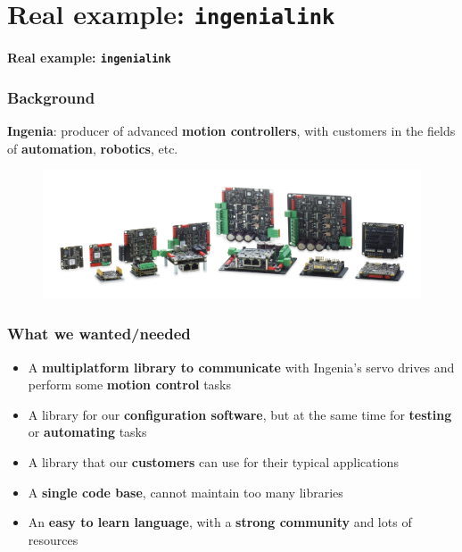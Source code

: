 \documentclass{beamer}
\begin{document}
\section{Real example: \texttt{ingenialink}}

\begin{frame}[plain]{}
  \begin{center}
    \Huge \textbf{Real example: \texttt{ingenialink}}
  \end{center}
\end{frame}

\begin{frame}
  \frametitle{Background}

  \textbf{Ingenia}: producer of advanced \textbf{motion controllers}, with
  customers in the fields of \textbf{automation}, \textbf{robotics}, etc.

  \begin{figure}
    \centering
    \includegraphics[width=\textwidth]{ingenia-servos.png}
  \end{figure}
\end{frame}

\begin{frame}
  \frametitle{What we wanted/needed}

  \begin{itemize}
    \item<1-> A \textbf{multiplatform library to communicate} with Ingenia's
      servo drives and perform some \textbf{motion control} tasks
    \item<2-> A library for our \textbf{configuration software}, but at the same
      time for \textbf{testing} or \textbf{automating} tasks
    \item<3-> A library that our \textbf{customers} can use for their typical
      applications
    \item<4-> A \textbf{single code base}, cannot maintain too many libraries
    \item<5-> An \textbf{easy to learn language}, with a \textbf{strong
      community} and lots of resources
  \end{itemize}
\end{frame}
\end{document}
